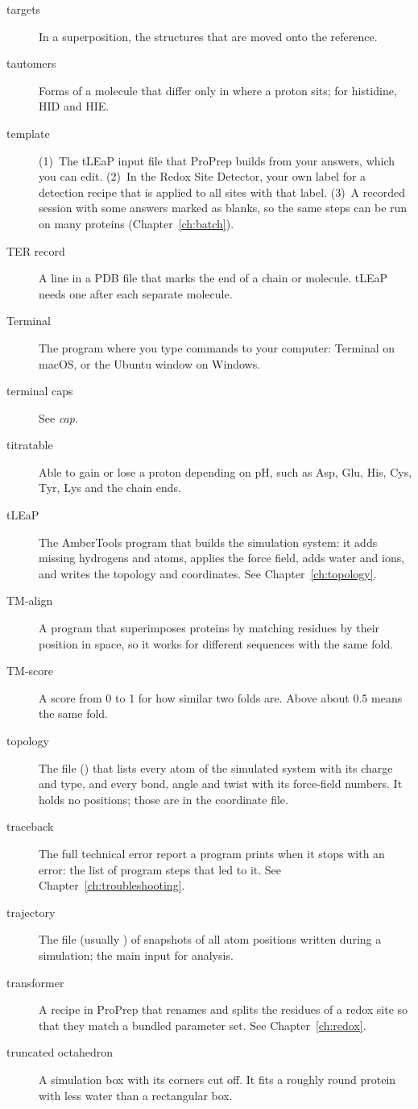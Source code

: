 \begin{description}
\item[targets] In a superposition, the structures that are moved onto the
  reference.
\item[tautomers] Forms of a molecule that differ only in where a proton sits;
  for histidine, HID and HIE.
\item[template] (1)~The tLEaP input file that ProPrep builds from your
  answers, which you can edit. (2)~In the Redox Site Detector, your own label
  for a detection recipe that is applied to all sites with that label. (3)~A
  recorded session with some answers marked as blanks, so the same steps can
  be run on many proteins (Chapter~\ref{ch:batch}).
\item[TER record] A line in a PDB file that marks the end of a chain or
  molecule. tLEaP needs one after each separate molecule.
\item[Terminal] The program where you type commands to your computer: Terminal
  on macOS, or the Ubuntu window on Windows.
\item[terminal caps] See \emph{cap}.
\item[titratable] Able to gain or lose a proton depending on pH, such as Asp,
  Glu, His, Cys, Tyr, Lys and the chain ends.
\item[tLEaP] The AmberTools program that builds the simulation system: it adds
  missing hydrogens and atoms, applies the force field, adds water and ions,
  and writes the topology and coordinates. See Chapter~\ref{ch:topology}.
\item[TM-align] A program that superimposes proteins by matching residues by
  their position in space, so it works for different sequences with the same
  fold.
\item[TM-score] A score from 0 to 1 for how similar two folds are. Above about
  0.5 means the same fold.
\item[topology] The file () that lists every atom of the
  simulated system with its charge and type, and every bond, angle and twist
  with its force-field numbers. It holds no positions; those are in the
  coordinate file.
\item[traceback] The full technical error report a program prints when it
  stops with an error: the list of program steps that led to it. See
  Chapter~\ref{ch:troubleshooting}.
\item[trajectory] The file (usually ) of snapshots of all atom
  positions written during a simulation; the main input for analysis.
\item[transformer] A recipe in ProPrep that renames and splits the residues of
  a redox site so that they match a bundled parameter set. See
  Chapter~\ref{ch:redox}.
\item[truncated octahedron] A simulation box with its corners cut off. It fits
  a roughly round protein with less water than a rectangular box.
\end{description}

